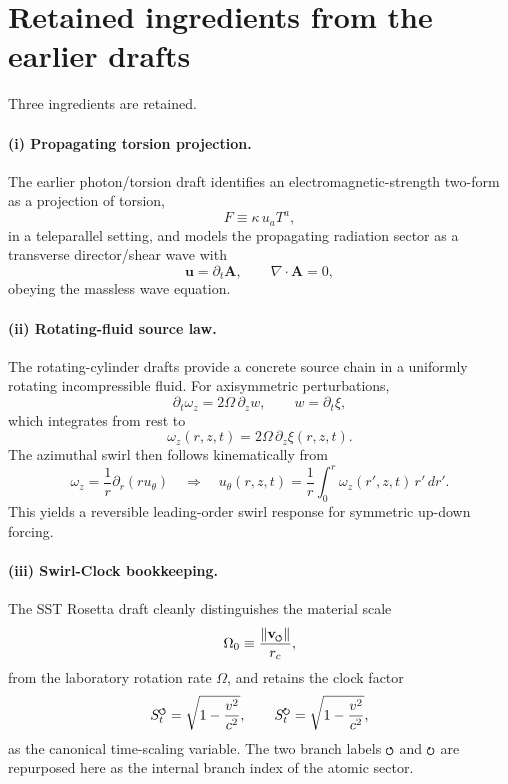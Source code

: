 \documentclass[11pt,a4paper]{article}
\newcommand{\swirlarrow}{\mathchoice{\mkern-2mu\scriptstyle\boldsymbol{\circlearrowleft}}{\mkern-2mu\scriptstyle\boldsymbol{\circlearrowleft}}{\mkern-2mu\scriptscriptstyle\boldsymbol{\circlearrowleft}}{\mkern-2mu\scriptscriptstyle\boldsymbol{\circlearrowleft}}}
\newcommand{\swirlarrowcw}{\mathchoice{\mkern-2mu\scriptstyle\boldsymbol{\circlearrowright}}{\mkern-2mu\scriptstyle\boldsymbol{\circlearrowright}}{\mkern-2mu\scriptscriptstyle\boldsymbol{\circlearrowright}}{\mkern-2mu\scriptscriptstyle\boldsymbol{\circlearrowright}}}
\newcommand{\vswirl}{\mathbf{v}_{\swirlarrow}}
\newcommand{\SwirlClock}{S_t^{\swirlarrow}}
\newcommand{\SwirlClockcw}{S_t^{\swirlarrowcw}}
\newcommand{\rc}{r_c}
\begin{document}
\section{Retained ingredients from the earlier drafts}
Three ingredients are retained.

\paragraph{(i) Propagating torsion projection.} The earlier photon/torsion draft identifies an electromagnetic-strength two-form as a projection of torsion,
\begin{equation}
\label{eq:Ftorsion}
F \equiv \kappa\,u_a T^a,
\end{equation}
in a teleparallel setting, and models the propagating radiation sector as a transverse director/shear wave with
\begin{equation}
\label{eq:uA}
\mathbf{u}=\partial_t \mathbf{A},
\qquad
\nabla\cdot \mathbf{A}=0,
\end{equation}
obeying the massless wave equation.

\paragraph{(ii) Rotating-fluid source law.} The rotating-cylinder drafts provide a concrete source chain in a uniformly rotating incompressible fluid. For axisymmetric perturbations,
\begin{equation}
\label{eq:wz}
\partial_t \omega_z = 2\Omega\,\partial_z w,
\qquad
w=\partial_t \xi,
\end{equation}
which integrates from rest to
\begin{equation}
\label{eq:wzxi}
\omega_z(r,z,t)=2\Omega\,\partial_z \xi(r,z,t).
\end{equation}
The azimuthal swirl then follows kinematically from
\begin{equation}
\label{eq:utheta}
\omega_z = \frac{1}{r}\partial_r(r u_\theta)
\quad\Longrightarrow\quad
u_\theta(r,z,t)=\frac{1}{r}\int_0^r \omega_z(r',z,t)\,r'\,dr'.
\end{equation}
This yields a reversible leading-order swirl response for symmetric up-down forcing.

\paragraph{(iii) Swirl-Clock bookkeeping.} The SST Rosetta draft cleanly distinguishes the material scale
\begin{equation}
\label{eq:Omega0}
\Omega_0 \equiv \frac{\lVert \vswirl\rVert}{\rc},
\end{equation}
from the laboratory rotation rate $\Omega$, and retains the clock factor
\begin{equation}
\label{eq:SwirlClock}
\SwirlClock = \sqrt{1-\frac{v^2}{c^2}},
\qquad
\SwirlClockcw = \sqrt{1-\frac{v^2}{c^2}},
\end{equation}
as the canonical time-scaling variable. The two branch labels $\swirlarrow$ and $\swirlarrowcw$ are repurposed here as the internal branch index of the atomic sector.
\end{document}
